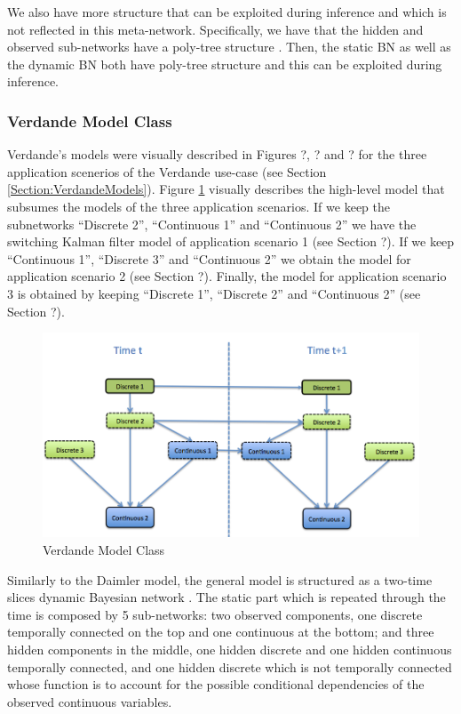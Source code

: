 We also have more structure that can be exploited during inference and which is not reflected in this meta-network. Specifically, we have that the hidden and observed sub-networks have a poly-tree structure \cite{nielsen2009bayesian}. Then, the static BN as well as the dynamic BN both have poly-tree structure and this can be exploited during inference. 



\subsubsection*{Verdande Model Class}

Verdande's models were visually described in Figures ?, ? and ? for the three application scenerios of the Verdande use-case (see Section \ref{Section:VerdandeModels}).
Figure \ref{Figure:VerdandeModelClass} visually describes the high-level model that subsumes the models
of the three application scenarios. If we keep the subnetworks ``Discrete 2'', ``Continuous 1'' and ``Continuous 2'' we have the switching Kalman filter model of application scenario 1 (see Section ?). If we keep ``Continuous 1'', ``Discrete 3'' and ``Continuous 2'' we obtain the model for application scenario 2 (see Section ?). Finally, the model for application scenario 3 is obtained by keeping ``Discrete 1'', ``Discrete 2'' and ``Continuous 2'' (see Section ?).  

\begin{figure}
\begin{center}
\includegraphics[scale=0.4]{./figures/VerdandeModelClass}
\caption{\label{Figure:VerdandeModelClass} Verdande Model Class}
\end{center}
\end{figure}

Similarly to the Daimler model, the general model is structured as a two-time slices dynamic Bayesian network \cite{nielsen2009bayesian}. The static part which is repeated through the time is composed by 5 sub-networks: two observed components, one discrete temporally connected on the top and one continuous at the bottom; and three hidden components in the middle, one hidden discrete and one hidden continuous temporally connected, and one hidden discrete which is not temporally connected whose function is to account for the possible conditional dependencies of the observed continuous variables.  

